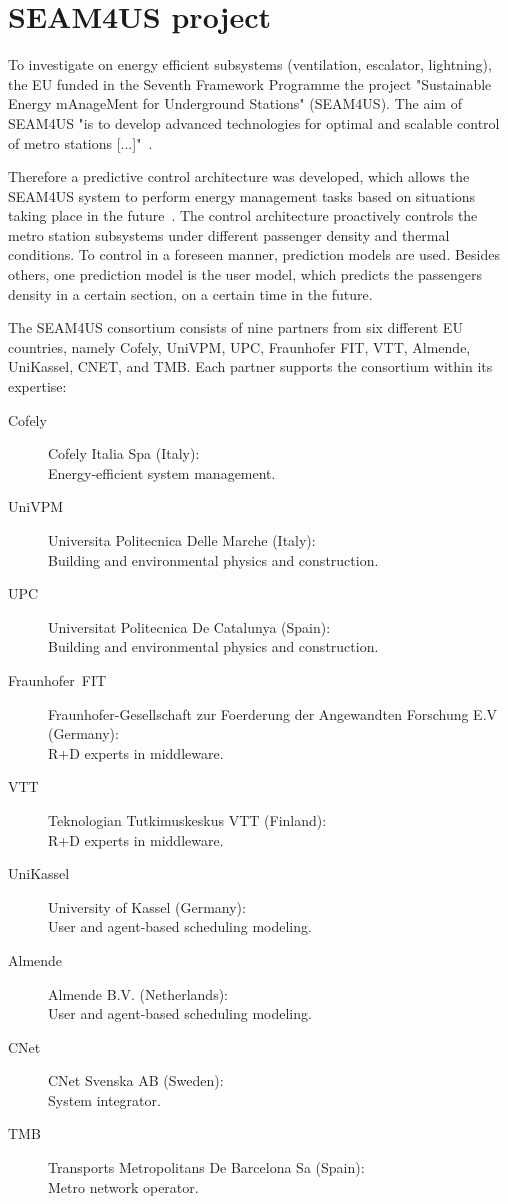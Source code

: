 
\section{SEAM4US project}
\label{sec:seam4us}

To investigate on energy efficient subsystems (ventilation, escalator, lightning), the EU funded in the Seventh Framework Programme the project "Sustainable Energy mAnageMent for Underground Stations" (SEAM4US). The aim of SEAM4US "is to develop advanced technologies for optimal and scalable control of metro stations [...]"~\cite{SEAM4US_Website}.

Therefore a predictive control architecture was developed, which allows the SEAM4US system to perform energy management tasks based on situations taking place in the future~\cite{ansuini_models_2013}. The control architecture proactively controls the metro station subsystems under different passenger density and thermal conditions.
To control in a foreseen manner, prediction models are used. Besides others, one prediction model is the user model, which predicts the passengers density in a certain section, on a certain time in the future.

The SEAM4US consortium consists of nine partners from six different EU countries, namely Cofely, UniVPM, UPC, Fraunhofer FIT, VTT, Almende, UniKassel, CNET, and TMB. Each partner supports the consortium within its expertise:

\begin{description}
  \item[Cofely] Cofely Italia Spa (Italy):\\Energy-efficient system management.
  \item[UniVPM] Universita Politecnica Delle Marche (Italy):\\Building and environmental physics and construction.
  \item[UPC] Universitat Politecnica De Catalunya (Spain):\\Building and environmental physics and construction.
  \item[Fraunhofer~FIT] Fraunhofer-Gesellschaft zur Foerderung der Angewandten Forschung E.V (Germany):\\R+D experts in middleware.
  \item[VTT] Teknologian Tutkimuskeskus VTT (Finland):\\R+D experts in middleware.
  \item[UniKassel] University of Kassel (Germany):\\User and agent-based scheduling modeling.
  \item[Almende] Almende B.V. (Netherlands):\\User and agent-based scheduling modeling.
  \item[CNet] CNet Svenska AB (Sweden):\\System integrator.
  \item[TMB] Transports Metropolitans De Barcelona Sa (Spain):\\Metro network operator.
\end{description}

